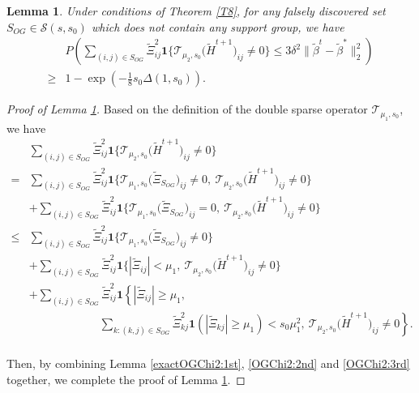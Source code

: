 \documentclass[12pt]{article}
\newtheorem{lemma}{Lemma}
\newtheorem{proof}{Proof}
\begin{document}
\begin{appendix}
\begin{lemma}\label{exactOGChi2}
    Under conditions of Theorem \ref{T8}, for any falsely discovered set $S_{OG} \in \mathcal S(s,s_0)$ which does not contain any support group, we have 
\begin{align*}
    & P\left(  \sum_{(i,j) \in S_{OG}} \tilde \Xi_{ij}^2 \mathbf1\Big\{ \mathcal T_{\mu_{2},s_0} \big(\tilde H^{t+1}\big)_{ij}\ne 0\Big\} 
    \le   3 \delta^2 \|\tilde \beta^t - \tilde \beta^* \|_2^2 \right) \\
    \ge& 1- \exp\left( -\frac18 s_0 \Delta(1,s_0) \right).
\end{align*} 
\end{lemma}

\begin{proof}[Proof of Lemma \ref{exactOGChi2}]
Based on the definition of the double sparse operator $\mathcal T_{\mu_1,s_0}$, we have 
    \begin{equation} 
\begin{aligned}
&   \sum_{(i,j) \in S_{OG}} \tilde \Xi_{ij}^2 \mathbf1\Big\{ \mathcal T_{\mu_{2},s_0} 
\big(\tilde H^{t+1}\big)_{ij}\ne 0\Big\} \\
= &   \sum_{(i,j) \in S_{OG}} \tilde\Xi_{ij}^2 \mathbf1\Big\{\mathcal T_{\mu_{1},s_0} \big(\tilde \Xi_{S_{OG}}\big)_{ij}\ne 0, ~ \mathcal T_{\mu_{2},s_0} \big(\tilde H^{t+1}\big)_{ij}\ne 0\Big\}\\
& + \sum_{(i,j) \in S_{OG}} \tilde \Xi_{ij}^2 \mathbf1\Big\{\mathcal T_{\mu_{1},s_0} 
\big(\tilde \Xi_{S_{OG}}\big)_{ij}= 0,~ \mathcal T_{\mu_{2},s_0} \big(\tilde H^{t+1}\big)_{ij}\ne 0\Big\} \\
\le & \sum_{(i,j) \in S_{OG}} \tilde \Xi_{ij}^2 \mathbf1\Big\{\mathcal T_{\mu_{1},s_0} \big( \tilde\Xi_{S_{OG}}\big)_{ij}\ne 0 \Big\} \\
 &+ \sum_{(i,j) \in S_{OG}} \tilde \Xi_{ij}^2\mathbf1\Big\{|\tilde\Xi_{ij}|< \mu_1,
 ~ \mathcal T_{\mu_{2},s_0} \big(\tilde H^{t+1}\big)_{ij}\ne 0\Big\} \\ 
& + \sum_{(i,j) \in S_{OG}} \tilde \Xi_{ij}^2\mathbf1\left\{|\tilde \Xi_{ij}|\ge \mu_1, \right.\\
& \qquad \qquad \qquad \left.~ \sum_{k: (k,j)\in S_{OG}} \tilde \Xi_{kj}^2 \mathbf1 (|\tilde \Xi_{kj}|\ge \mu_1)< s_0\mu_1^2,~
  \mathcal T_{\mu_{2},s_0} \big(\tilde H^{t+1}\big)_{ij}\ne 0\right\}.  \\ 
\end{aligned}
    \end{equation}
    
Then, by combining Lemma \ref{exactOGChi2:1st}, \ref{OGChi2:2nd} and \ref{OGChi2:3rd} together, we complete the proof of Lemma \ref{exactOGChi2}.    
\end{proof}



\end{appendix}
\end{document}
